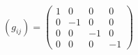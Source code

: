\begin{align*}
(g_{ij}) = \begin{pmatrix}
1 & 0 & 0 & 0 \\
0 & -1 & 0 & 0 \\
0 & 0 & -1 & 0 \\
0 & 0 & 0 & -1
\end{pmatrix}
\end{align*} 

